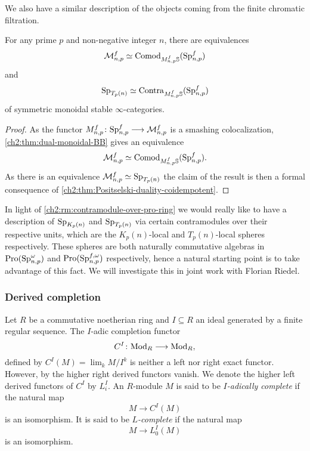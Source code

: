 We also have a similar description of the objects coming from the finite chromatic filtration. 

\begin{proposition}
    For any prime $p$ and non-negative integer $n$, there are equivalences 
    \[\mathcal{M}_{n,p}^f \simeq \mathrm{Comod}_{M_{n,p}^f\mathbb{S}}(\mathrm{Sp}_{n,p}^f)\] 
    and 
    \[\mathrm{Sp}_{T_p(n)}\simeq \mathrm{Contra}_{M_{n,p}^f\mathbb{S}}(\mathrm{Sp}_{n,p}^f)\] 
    of symmetric monoidal stable $\infty$-categories. 
\end{proposition}
\begin{proof}
    As the functor $M_{n,p}^f\colon \mathrm{Sp}_{n,p}^f \longrightarrow \mathcal{M}_{n,p}^f$ is a smashing colocalization, \cref{ch2:thm:dual-monoidal-BB} gives an equivalence 
    \[\mathcal{M}_{n,p}^f \simeq \mathrm{Comod}_{M_{n,p}^f \mathbb{S}}(\mathrm{Sp}_{n,p}^f).\]
    As there is an equivalence $\mathcal{M}_{n,p}^f \simeq \mathrm{Sp}_{T_p(n)}$ the claim of the result is then a formal consequence of \cref{ch2:thm:Positselski-duality-coidempotent}.
\end{proof}

\begin{remark}
    In light of \cref{ch2:rm:contramodule-over-pro-ring} we would really like to have a description of $\mathrm{Sp}_{{K_p(n)}}$ and $\mathrm{Sp}_{T_p(n)}$ via certain contramodules over their respective units, which are the $K_p(n)$-local and $T_p(n)$-local spheres respectively. These spheres are both naturally commutative algebras in $\operatorname{Pro}(\mathrm{Sp}_{n,p}^\omega)$ and $\operatorname{Pro}(\mathrm{Sp}_{n,p}^{f, \omega})$ respectively, hence a natural starting point is to take advantage of this fact. We will investigate this in joint work with Florian Riedel. 
\end{remark}

\subsubsection*{Derived completion}
\label{ch2:ssec:derived-completion}

Let $R$ be a commutative noetherian ring and $I\subseteq R$ an ideal generated by a finite regular sequence. The $I$-adic completion functor 
\[C^I\colon \mathrm{Mod}_R \longrightarrow \mathrm{Mod}_R,\] 
defined by $C^I(M)=\lim_k M/I^k$ is neither a left nor right exact functor. However, by \cite[5.1]{greenlees-may_92} the higher right derived functors vanish. We denote the higher left derived functors of $C^I$ by $L^I_i$. An $R$-module $M$ is said to be \emph{$I$-adically complete} if the natural map 
\[M\to C^I (M)\] 
is an isomorphism. It is said to be \emph{$L$-complete} if the natural map 
\[M\to L_0^I(M)\] 
is an isomorphism. 

